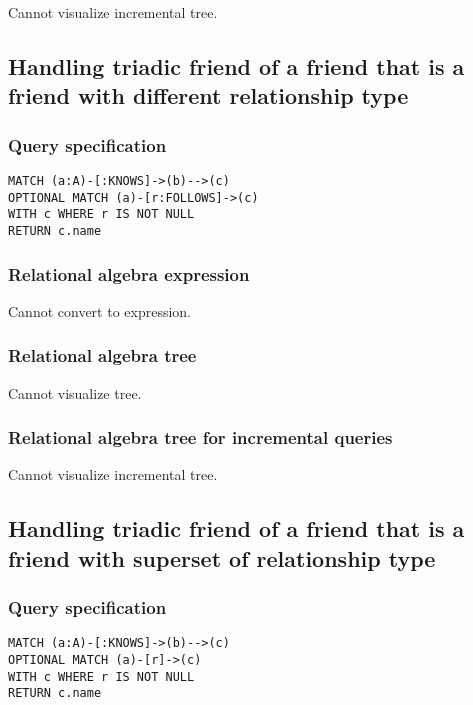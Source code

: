 Cannot visualize incremental tree.

\subsection{Handling triadic friend of a friend that is a friend with different relationship type}

\subsubsection*{Query specification}

\begin{lstlisting}
MATCH (a:A)-[:KNOWS]->(b)-->(c)
OPTIONAL MATCH (a)-[r:FOLLOWS]->(c)
WITH c WHERE r IS NOT NULL
RETURN c.name
\end{lstlisting}

\subsubsection*{Relational algebra expression}

Cannot convert to expression.

\subsubsection*{Relational algebra tree}

Cannot visualize tree.

\subsubsection*{Relational algebra tree for incremental queries}

Cannot visualize incremental tree.

\subsection{Handling triadic friend of a friend that is a friend with superset of relationship type}

\subsubsection*{Query specification}

\begin{lstlisting}
MATCH (a:A)-[:KNOWS]->(b)-->(c)
OPTIONAL MATCH (a)-[r]->(c)
WITH c WHERE r IS NOT NULL
RETURN c.name
\end{lstlisting}

